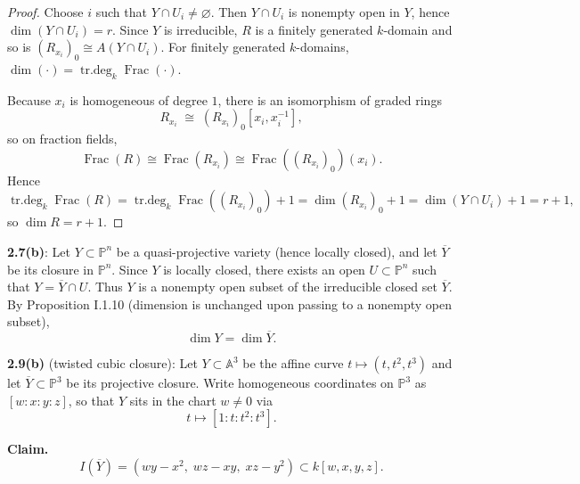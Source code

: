 \documentclass[12pt]{article}
\numberwithin{thm}{subsection}
\numberwithin{defn}{subsection}
\numberwithin{lemma}{subsection}
\numberwithin{example}{subsection}
\numberwithin{notation}{subsection}
\numberwithin{cor}{subsection}
\numberwithin{remark}{subsection}
\numberwithin{condition}{subsection}
\numberwithin{question}{subsection}
\numberwithin{construction}{subsection}
\numberwithin{construction}{subsection}
\numberwithin{construction}{subsection}
\begin{document}
\begin{proof}
Choose $i$ such that $Y\cap U_i\neq\varnothing$. Then $Y\cap U_i$ is nonempty open in $Y$, hence $\dim(Y\cap U_i)=r$.
Since $Y$ is irreducible, $R$ is a finitely generated $k$-domain and so is $(R_{x_i})_0\cong A(Y\cap U_i)$.
For finitely generated $k$-domains, $\dim(\cdot)=\operatorname{tr.deg}_k\operatorname{Frac}(\cdot)$.

Because $x_i$ is homogeneous of degree $1$, there is an isomorphism of graded rings
\[
R_{x_i}\;\cong\; (R_{x_i})_0[x_i,x_i^{-1}],
\]
so on fraction fields,
\[
\operatorname{Frac}(R)\cong \operatorname{Frac}(R_{x_i})\cong \operatorname{Frac}((R_{x_i})_0)(x_i).
\]
Hence
\[
\operatorname{tr.deg}_k\operatorname{Frac}(R)
=
\operatorname{tr.deg}_k\operatorname{Frac}((R_{x_i})_0)+1
=
\dim (R_{x_i})_0 +1
=
\dim(Y\cap U_i)+1
=
r+1,
\]
so $\dim R=r+1$.
\end{proof}

\bigskip

\textbf{2.7(b)}:
Let $Y\subset \mathbb P^n$ be a quasi-projective variety (hence locally closed), and let $\overline Y$ be its closure in $\mathbb P^n$.
Since $Y$ is locally closed, there exists an open $U\subset \mathbb P^n$ such that $Y=\overline Y\cap U$.
Thus $Y$ is a nonempty open subset of the irreducible closed set $\overline Y$.
By Proposition I.1.10 (dimension is unchanged upon passing to a nonempty open subset),
\[
\dim Y = \dim \overline Y.
\]

\bigskip

\textbf{2.9(b)} (twisted cubic closure):
Let $Y\subset \mathbb A^3$ be the affine curve $t\mapsto (t,t^2,t^3)$ and let $\overline Y\subset \mathbb P^3$ be its projective closure.
Write homogeneous coordinates on $\mathbb P^3$ as $[w:x:y:z]$, so that $Y$ sits in the chart $w\neq 0$ via
\[
t\longmapsto [1:t:t^2:t^3].
\]

\medskip
\textbf{Claim.} 
\[
I(\overline Y)=(wy-x^2,\; wz-xy,\; xz-y^2)\subset k[w,x,y,z].
\]
\end{document}
